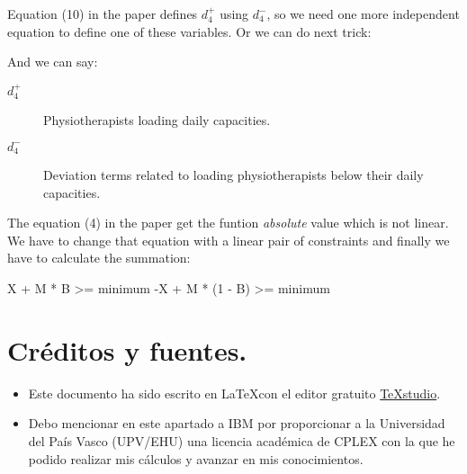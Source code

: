 \documentclass[a4paper,12pt]{article}
\begin{document}
Equation (10) in the paper defines $d_4^+$ using $d_4^-$, so we need one more independent equation to define one of these variables. Or we can do next trick:
\begin{lpformulation}
\end{lpformulation}
And we can say:
\begin{description}
	\item[$d_4^+$] Physiotherapists loading daily capacities.
	\item[$d_4^-$] Deviation terms related to loading physiotherapists below their daily capacities.
\end{description}

The equation (4) in the paper get the funtion \textit{absolute} value which is not linear. We have to change that equation with a linear pair of constraints and finally we have to calculate the summation:
\begin{lpformulation}
\end{lpformulation}

X + M * B >= minimum
-X + M * (1 - B) >= minimum





	
\section{Créditos y fuentes.}
	
	\begin{itemize}
		\item Este documento ha sido escrito en \LaTeX con el editor gratuito  \href{https://www.texstudio.org/}{TeXstudio}.
		\item Debo mencionar en este apartado a IBM por proporcionar a la Universidad del País Vasco (UPV/EHU) una licencia académica de CPLEX \texttrademark con la que he podido realizar mis cálculos y avanzar en mis conocimientos.
	\end{itemize}
	
	
	
	
	
\end{document}
